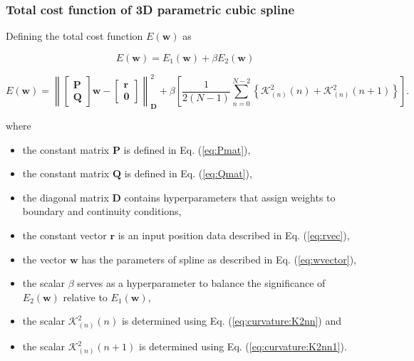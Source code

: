 \subsubsection{Total cost function of 3D parametric cubic spline}
\label{sec:TotalCostFunc}

Defining the total cost function $E(\mathbf{w})$ as

\begin{equation}
E(\mathbf{w})=E_{1}(\mathbf{w})+\beta E_{2}(\mathbf{w})
\end{equation}

\begin{equation}
E(\mathbf{w})
=
\left\|
\begin{bmatrix}
\mathbf{P}\\
\mathbf{Q}
\end{bmatrix}
\mathbf{w}
-
\begin{bmatrix}
\mathbf{r}\\
\mathbf{0}
\end{bmatrix}
\right\|_{\mathbf{D}}^{2}
+\beta 
\left[
\frac{1}{2(N-1)}
\sum\limits_{n=0}^{N-2}
\left\{
\mathcal{K}_{(n)}^{2}(n)
+
\mathcal{K}_{(n)}^{2}(n+1)
\right\}
\right].
\end{equation}

where 
\begin{itemize}
\item the constant matrix $\mathbf{P}$ is defined in Eq. (\ref{eq:Pmat}),
\item the constant matrix $\mathbf{Q}$ is defined in Eq. (\ref{eq:Qmat}),
\item the diagonal matrix $\mathbf{D}$ contains hyperparameters that assign weights to boundary and continuity conditions,
\item the constant vector $\mathbf{r}$ is an input position data described in Eq. (\ref{eq:rvec}),
\item the vector $\mathbf{w}$ has the parameters of spline as described in Eq. (\ref{eq:wvector}),
\item the scalar $\beta$ serves as a hyperparameter to balance the significance of $E_{2}(\mathbf{w})$ relative to $E_{1}(\mathbf{w})$,
\item the scalar $\mathcal{K}_{(n)}^{2}(n)$ is determined using Eq. (\ref{eq:curvature:K2nn}) and 
\item the scalar $\mathcal{K}_{(n)}^{2}(n+1)$ is determined using Eq. (\ref{eq:curvature:K2nn1}).
\end{itemize}
